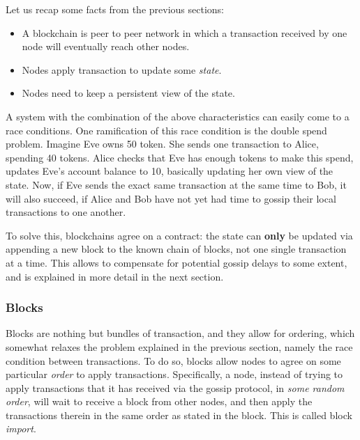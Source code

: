 Let us recap some facts from the previous sections:

\begin{itemize}
	\item A blockchain is peer to peer network in which a transaction received by one node will
	eventually reach other nodes.
	\item Nodes apply transaction to update some \textit{state}.
	\item Nodes need to keep a persistent view of the state.
\end{itemize}

A system with the combination of the above characteristics can easily come to a race conditions. One
ramification of this race condition is the double spend problem. Imagine Eve owns 50 token. She
sends one transaction to Alice, spending 40 tokens. Alice checks that Eve has enough tokens to make
this spend, updates Eve's account balance to 10, basically updating her own view of the state. Now,
if Eve sends the exact same transaction at the same time to Bob, it will also succeed, if Alice and
Bob have not yet had time to gossip their local transactions to one another.

To solve this, blockchains agree on a contract: the state can \textbf{only} be updated via appending
a new block to the known chain of blocks, not one single transaction at a time. This allows to
compensate for potential gossip delays to some extent, and is explained in more detail in the next
section.

\subsubsection{Blocks} \label{chap_bg:subsec:block}


Blocks are nothing but bundles of transaction, and they allow for ordering, which somewhat relaxes
the problem explained in the previous section, namely the race condition between transactions. To do
so, blocks allow nodes to agree on some particular \textit{order} to apply transactions.
Specifically, a node, instead of trying to apply transactions that it has received via the gossip
protocol, in \textit{some random order}, will wait to receive a block from other nodes, and then
apply the transactions therein in the same order as stated in the block. This is called block
\textit{import}.

